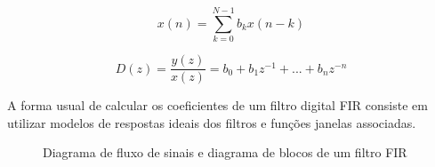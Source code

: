 		\begin{equation}
			x(n) = \sum_{k=0}^{N-1} b_k x(n-k)
			\label{eq-fir-01}
		\end{equation}
		
		\begin{equation}
			D(z) = \frac{y(z)}{x(z)} = b_0 + b_1z^{-1}+...+b_nz^{-n}
			\label{eq-fir-02}
		\end{equation}
		
		
		A forma usual de calcular os coeficientes de um filtro digital FIR consiste em utilizar modelos de respostas ideais dos filtros e funções janelas associadas.
		
		\begin{figure}[!htb]
			\centering
			\qquad
			\caption{Diagrama de fluxo de sinais e diagrama de blocos de um filtro FIR}
			\label{fig01-fir}	
		\end{figure}
		
